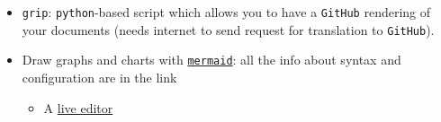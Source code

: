 \documentclass[a4paper,12pt,%
              final%
              ]{article}
\begin{document}
\begin{itemize}
    \begin{itemize}
      \item \texttt{GitLab} has native support for equations (\LaTeX-like): inline with \verb|$`\alpha`$| (backticks), display with
\begin{verbatim}
```math
\alpha
```
\end{verbatim}
      \item \texttt{GitHub} flavored cannot. However, there seems to be some workarounds, see \href{https://stackoverflow.com/questions/11256433/how-to-show-math-equations-in-general-githubs-markdownnot-githubs-blog}{here} (linking to third-party render) or \href{https://gist.github.com/cyhsutw/d5983d166fb70ff651f027b2aa56ee4e}{here} (write \LaTeX{} code inside a \texttt{jupyter} notebook, for tips about \LaTeX{} and \texttt{jupyter} see \texttt{python} section, \ref{sec:python}, and/or \href{https://jupyterbook.org/content/math.html}{here})
    \end{itemize}
  \item \texttt{grip}: \texttt{python}-based script which allows you to have a \texttt{GitHub} rendering of your documents (needs internet to send request for translation to \texttt{GitHub}).
  \item Draw graphs and charts with \href{https://mermaid-js.github.io/mermaid/#/}{\texttt{mermaid}}: all the info about syntax and configuration are in the link
    \begin{itemize}
      \item A \href{https://mermaid-js.github.io/mermaid-live-editor}{live editor}
    \end{itemize}
\end{itemize}

\end{document}

